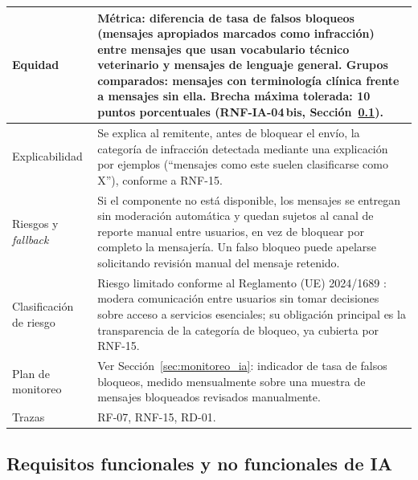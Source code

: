 \documentclass[journal,onecolumn]{IEEEtran}
\begin{document}
\begin{table}[H]
\begin{tabularx}{\textwidth}{|L{4.2cm}|X|}
		\hline
		Equidad & Métrica: diferencia de tasa de falsos bloqueos (mensajes apropiados marcados como infracción) entre mensajes que usan vocabulario técnico veterinario y mensajes de lenguaje general. Grupos comparados: mensajes con terminología clínica frente a mensajes sin ella. Brecha máxima tolerada: 10 puntos porcentuales (RNF-IA-04\,bis, Sección~\ref{sec:req_ia_tabla}). \\
		\hline
		Explicabilidad & Se explica al remitente, antes de bloquear el envío, la categoría de infracción detectada mediante una explicación por ejemplos (``mensajes como este suelen clasificarse como X''), conforme a RNF-15. \\
		\hline
		Riesgos y \textit{fallback} & Si el componente no está disponible, los mensajes se entregan sin moderación automática y quedan sujetos al canal de reporte manual entre usuarios, en vez de bloquear por completo la mensajería. Un falso bloqueo puede apelarse solicitando revisión manual del mensaje retenido. \\
		\hline
		Clasificación de riesgo & Riesgo limitado conforme al Reglamento (UE) 2024/1689 \cite{euaiact2024}: modera comunicación entre usuarios sin tomar decisiones sobre acceso a servicios esenciales; su obligación principal es la transparencia de la categoría de bloqueo, ya cubierta por RNF-15. \\
		\hline
		Plan de monitoreo & Ver Sección~\ref{sec:monitoreo_ia}: indicador de tasa de falsos bloqueos, medido mensualmente sobre una muestra de mensajes bloqueados revisados manualmente. \\
		\hline
		Trazas & RF-07, RNF-15, RD-01. \\
		\hline
	\end{tabularx}
\end{table}
\newpage

\subsection{Requisitos funcionales y no funcionales de IA}
\label{sec:req_ia_tabla}
\end{document}

